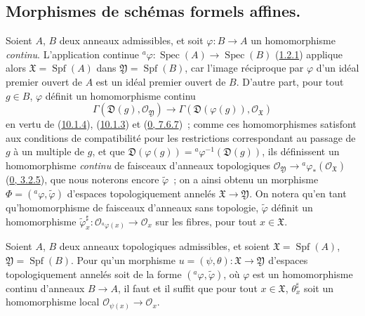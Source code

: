 \subsection{Morphismes de schémas formels affines.}
\label{subsection:I.10.2-fr}

\begin{env}[10.2.1]
\label{I.10.2.1-fr}
Soient $A$, $B$ deux anneaux admissibles, et soit
$\varphi:B\to A$ un homomorphisme \emph{continu}. L'application continue
$ {}^a\varphi:\operatorname{Spec}(A)\to\operatorname{Spec}(B)$
(\hyperref[I.1.2.1-fr]{1.2.1}) applique alors
$\mathfrak{X}=\operatorname{Spf}(A)$ dans
$\mathfrak{Y}=\operatorname{Spf}(B)$, car l'image réciproque par
$\varphi$ d'un idéal premier ouvert de $A$ est un idéal premier ouvert de
$B$. D'autre part, pour tout $g\in B$, $\varphi$ définit un homomorphisme
continu
\[
  \Gamma(\mathfrak{D}(g),\mathscr{O}_{\mathfrak{Y}})
  \longrightarrow
  \Gamma(\mathfrak{D}(\varphi(g)),\mathscr{O}_{\mathfrak{X}})
\]
en vertu de (\hyperref[I.10.1.4-fr]{10.1.4}),
(\hyperref[I.10.1.3-fr]{10.1.3}) et
(\hyperref[0.7.6.7-fr]{0, 7.6.7})~; comme ces homomorphismes satisfont aux
conditions de compatibilité pour les restrictions correspondant au
passage de $g$ à un multiple de $g$, et que
$\mathfrak{D}(\varphi(g))={}^a\varphi^{-1}(\mathfrak{D}(g))$, ils
définissent un homomorphisme \emph{continu} de faisceaux d'anneaux
topologiques
$\mathscr{O}_{\mathfrak{Y}}\to
{}^a\varphi_*(\mathscr{O}_{\mathfrak{X}})$
(\hyperref[0.3.2.5-fr]{0, 3.2.5}), que nous noterons encore
$\widetilde{\varphi}$~; on a ainsi obtenu un morphisme
$\Phi=({}^a\varphi,\widetilde{\varphi})$ d'espaces topologiquement annelés
$\mathfrak{X}\to\mathfrak{Y}$. On notera qu'en tant qu'homomorphisme de
faisceaux d'anneaux sans topologie, $\widetilde{\varphi}$ définit un
homomorphisme
$\widetilde{\varphi}_x^\sharp:
\mathscr{O}_{{}^a\varphi(x)}\to\mathscr{O}_x$ sur les fibres, pour tout
$x\in\mathfrak{X}$.
\end{env}

\begin{proposition}[10.2.2]
\label{I.10.2.2-fr}
Soient $A$, $B$ deux anneaux topologiques admissibles, et soient
$\mathfrak{X}=\operatorname{Spf}(A)$,
$\mathfrak{Y}=\operatorname{Spf}(B)$. Pour qu'un morphisme
$u=(\psi,\theta):\mathfrak{X}\to\mathfrak{Y}$ d'espaces topologiquement
annelés soit de la forme $({}^a\varphi,\widetilde{\varphi})$, où
$\varphi$ est un homomorphisme continu d'anneaux $B\to A$, il faut et il
suffit que pour tout $x\in\mathfrak{X}$,
$\theta_x^\sharp$ soit un homomorphisme local
$\mathscr{O}_{\psi(x)}\to\mathscr{O}_x$.
\end{proposition}

